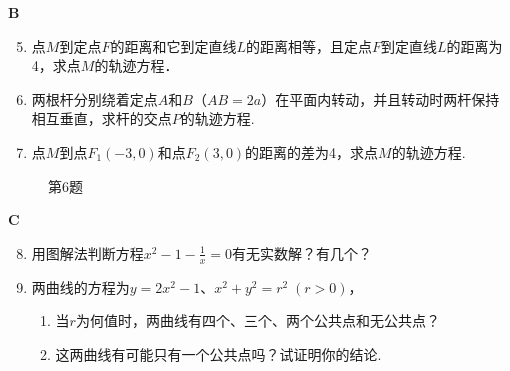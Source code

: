\begin{center}
    \bfseries B
\end{center}

\begin{enumerate}\setcounter{enumi}{4}
    \item 点$M$到定点$F$的距离和它到定直线$L$的距离相等，且定点$F$到定直线$L$的距离为4，求点$M$的轨迹方程．
    \item 两根杆分别绕着定点$A$和$B$（$AB=2a$）在平面内转动，并且转动时两杆保持相互垂直，求杆的交点$P$的轨迹方程.
    \item  点$M$到点$F_1(-3,0)$和点$F_2(3,0)$的距离的差为4，求点$M$的轨迹方程.
\end{enumerate}

\begin{figure}[htp]
    \centering
{}
    \caption*{第6题}
\end{figure}

\begin{center}
    \bfseries C
\end{center}

\begin{enumerate}\setcounter{enumi}{7}
    \item 用图解法判断方程$x^2-1-\frac{1}{x}=0$有无实数解？有几个？
    \item 两曲线的方程为$y=2x^2-1$、$x^2+y^2=r^2\; (r>0)$，
\begin{enumerate}[(1)]
\item 当$r$为何值时，两曲线有四个、三个、两个公共点和无公共点？
\item 这两曲线有可能只有一个公共点吗？试证明你的结论.
\end{enumerate}
\end{enumerate}